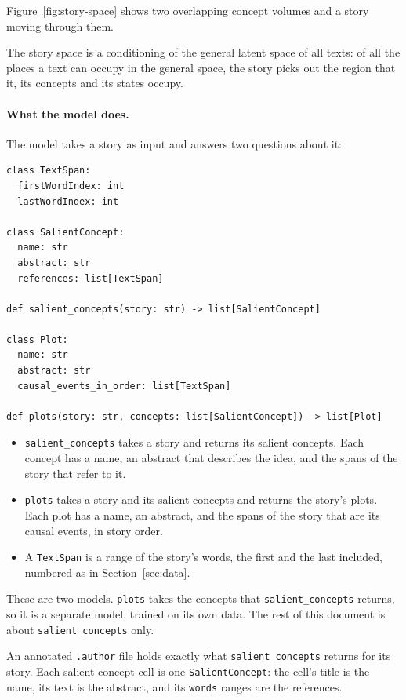 \documentclass[11pt]{article}
\theoremstyle{remark}
\begin{document}
Figure~\ref{fig:story-space} shows two overlapping concept volumes and a story moving through them.

The story space is a conditioning of the general latent space of all texts: of all the places a text can occupy in the general space, the story picks out the region that it, its concepts and its states occupy.

\paragraph{What the model does.} The model takes a story as input and answers two questions about it:
\begin{verbatim}
class TextSpan:
  firstWordIndex: int
  lastWordIndex: int

class SalientConcept:
  name: str
  abstract: str
  references: list[TextSpan]

def salient_concepts(story: str) -> list[SalientConcept]

class Plot:
  name: str
  abstract: str
  causal_events_in_order: list[TextSpan]

def plots(story: str, concepts: list[SalientConcept]) -> list[Plot]
\end{verbatim}
\begin{itemize}
  \item \texttt{salient\_concepts} takes a story and returns its salient concepts. Each concept has a name, an abstract that describes the idea, and the spans of the story that refer to it.
  \item \texttt{plots} takes a story and its salient concepts and returns the story's plots. Each plot has a name, an abstract, and the spans of the story that are its causal events, in story order.
  \item A \texttt{TextSpan} is a range of the story's words, the first and the last included, numbered as in Section~\ref{sec:data}.
\end{itemize}
These are two models. \texttt{plots} takes the concepts that \texttt{salient\_concepts} returns, so it is a separate model, trained on its own data. The rest of this document is about \texttt{salient\_concepts} only.

An annotated \texttt{.author} file holds exactly what \texttt{salient\_concepts} returns for its story. Each salient-concept cell is one \texttt{SalientConcept}: the cell's title is the name, its text is the abstract, and its \texttt{words} ranges are the references.
\end{document}
